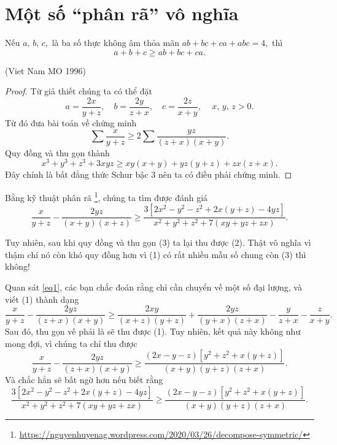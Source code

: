 \documentclass[12pt,a4paper]{book}
\begin{document}

\section{Một số “phân rã” vô nghĩa}

\begin{baitoan} 
Nếu $a,\,b,\,c,$ là ba số thực không âm thỏa mãn $ab+bc+ca+abc=4,$ thì
$$a+b+c \geqslant ab+bc+ca.$$
\begin{flushright}(Viet Nam MO 1996)\end{flushright}
\end{baitoan}

\begin{proof}
Từ giả thiết chúng ta có thể đặt
$$\displaystyle a = \frac{2x}{y+z} , \quad b = \frac{2y}{z+x}, \quad c = \frac{2z}{x+y},\, \quad x, \, y, \, z > 0.$$
Từ đó đưa bài toán về chứng minh
\begin{equation}\label{eq1} %
\sum \frac{x}{y+z} \geqslant 2 \sum \frac{yz}{(z+x)(x+y)}.
\end{equation}
Quy đồng và thu gọn thành
\begin{equation}\label{eq2} 
x^3+y^3+z^3+3xyz \geqslant xy(x+y) + yz(y+z) + zx(z+x).
\end{equation}
Đây chính là bất đẳng thức Schur bậc $3$ nên ta có điều phải chứng minh.
\end{proof}

Bằng kỹ thuật phân rã \footnote{\url{https://nguyenhuyenag.wordpress.com/2020/03/26/decompose-symmetric/}}, chúng ta tìm được đánh giá
\begin{equation}\label{eq3} %
\frac{x}{y+z}-\frac{2yz}{(x+y)(x+z)} \geqslant \frac{3[2x^{2}-y^2-z^2+2x(y+z)-4yz]}{x^2+y^2+z^2+7(xy+yz+zx)}.
\end{equation}

Tuy nhiên, sau khi quy đồng và thu gọn (3) ta lại thu được (2). Thật vô nghĩa vì thậm chí nó còn khó quy đồng hơn vì (1) có rất nhiều mẫu số chung còn (3) thì không!

Quan sát \eqref{eq1}, các bạn chắc đoán rằng chỉ cần chuyển vế một số đại lượng, và viết (1) thành dạng
$$\displaystyle \frac{x}{y+z} - \frac{2yz}{(z+x)(x+y)} \geqslant \frac{2xy}{(x+z)(y+z)}+\frac{2yz}{(y+x)(z+x)} - \frac{y}{z+x}- \frac{z}{x+y}.$$
Sau đó, thu gọn vế phải là sẽ thu được (1). Tuy nhiên, kết quả này không như mong đợi, vì chúng ta chỉ thu được
$$\displaystyle \frac{x}{y+z} - \frac{2yz}{(z+x)(x+y)} \geqslant \frac{(2x-y-z)[y^2+z^2+x(y+z)]}{(x+y)(y+z)(z+x)}.$$
Và chắc hẳn sẽ bất ngờ hơn nếu biết rằng 
$$\displaystyle \frac{3\left[2x^{2}-y^2-z^2+2x(y+z)-4yz\right]}{x^2+y^2+z^2+7(xy+yz+zx)} \geqslant  \frac{(2x-y-z)[y^2+z^2+x(y+z)]}{(x+y)(y+z)(z+x)}.$$
\end{document}
